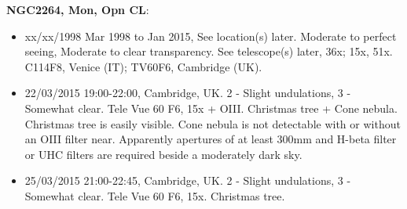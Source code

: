 {\bf NGC2264, Mon, Opn CL}:
\begin{itemize}
\item xx/xx/1998 Mar 1998 to Jan 2015, See location(s) later. Moderate to perfect seeing, Moderate to clear transparency. See telescope(s) later, 36x; 15x, 51x. C114F8, Venice (IT); TV60F6, Cambridge (UK).
\item 22/03/2015 19:00-22:00, Cambridge, UK. 2 - Slight undulations, 3 - Somewhat clear. Tele Vue 60 F6, 15x + OIII. Christmas tree + Cone nebula. Christmas tree is easily visible. Cone nebula is not detectable with or without an OIII filter near. Apparently apertures of at least 300mm and H-beta filter or UHC filters are required beside a moderately dark sky.
\item 25/03/2015 21:00-22:45, Cambridge, UK. 2 - Slight undulations, 3 - Somewhat clear. Tele Vue 60 F6, 15x. Christmas tree. 
\end{itemize}
